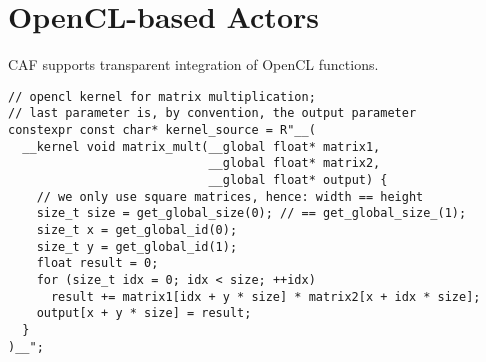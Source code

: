 \section{OpenCL-based Actors}

CAF supports transparent integration of OpenCL functions.


\begin{lstlisting}
// opencl kernel for matrix multiplication;
// last parameter is, by convention, the output parameter
constexpr const char* kernel_source = R"__(
  __kernel void matrix_mult(__global float* matrix1,
                            __global float* matrix2,
                            __global float* output) {
    // we only use square matrices, hence: width == height
    size_t size = get_global_size(0); // == get_global_size_(1);
    size_t x = get_global_id(0);
    size_t y = get_global_id(1);
    float result = 0;
    for (size_t idx = 0; idx < size; ++idx)
      result += matrix1[idx + y * size] * matrix2[x + idx * size];
    output[x + y * size] = result;
  }
)__";
\end{lstlisting}


